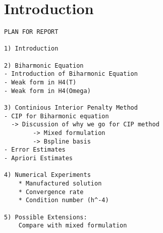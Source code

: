 \section{Introduction}\label{sec:introduction}




\begin{verbatim}
PLAN FOR REPORT

1) Introduction

2) Biharmonic Equation
- Introduction of Biharmonic Equation
- Weak form in H4(T)
- Weak form in H4(Omega)

3) Continious Interior Penalty Method
- CIP for Biharmonic equation
  -> Discussion of why we go for CIP method
        -> Mixed formulation
        -> Bspline basis
- Error Estimates
- Apriori Estimates

4) Numerical Experiments
    * Manufactured solution
    * Convergence rate
    * Condition number (h^-4)

5) Possible Extensions:
    Compare with mixed formulation
\end{verbatim}




